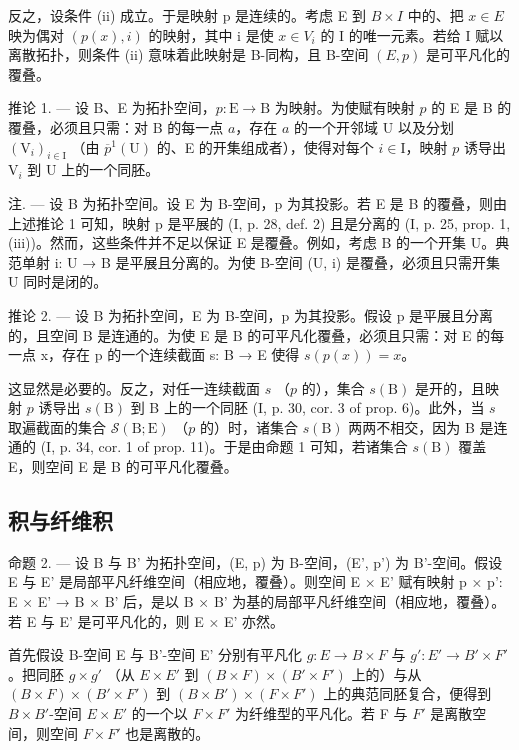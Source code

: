 反之，设条件 (ii) 成立。于是映射 p 是连续的。考虑 E 到 \(B \times I\) 中的、把 \(x \in E\) 映为偶对 \((p(x), i)\) 的映射，其中 i 是使 \(x \in V_i\) 的 I 的唯一元素。若给 I 赋以离散拓扑，则条件 (ii) 意味着此映射是 B-同构，且 B-空间 \((E, p)\) 是可平凡化的覆叠。

推论 1. --- 设 B、E 为拓扑空间，\(p\colon \mathrm{E}\to \mathrm{B}\) 为映射。为使赋有映射 \(p\) 的 E 是 B 的覆叠，必须且只需：对 B 的每一点 \(a\)，存在 \(a\) 的一个开邻域 U 以及分划 \((\mathrm{V}_i)_{i\in \mathrm{I}}\) （由 \(\overline{p}^{1}(\mathrm{U})\) 的、E 的开集组成者），使得对每个 \(i\in \mathrm{I}\)，映射 \(p\) 诱导出 \(\mathrm{V}_i\) 到 U 上的一个同胚。

注. --- 设 B 为拓扑空间。设 E 为 B-空间，p 为其投影。若 E 是 B 的覆叠，则由上述推论 1 可知，映射 p 是平展的 (I, p. 28, def. 2) 且是分离的 (I, p. 25, prop. 1, (iii))。然而，这些条件并不足以保证 E 是覆叠。例如，考虑 B 的一个开集 U。典范单射 i: U → B 是平展且分离的。为使 B-空间 (U, i) 是覆叠，必须且只需开集 U 同时是闭的。

推论 2. --- 设 B 为拓扑空间，E 为 B-空间，p 为其投影。假设 p 是平展且分离的，且空间 B 是连通的。为使 E 是 B 的可平凡化覆叠，必须且只需：对 E 的每一点 x，存在 p 的一个连续截面 s: B → E 使得 \(s(p(x)) = x\)。

这显然是必要的。反之，对任一连续截面 \(s\) （\(p\) 的），集合 \(s(\mathrm{B})\) 是开的，且映射 \(p\) 诱导出 \(s(\mathrm{B})\) 到 B 上的一个同胚 (I, p. 30, cor. 3 of prop. 6)。此外，当 \(s\) 取遍截面的集合 \(\mathcal{S}(\mathrm{B};\mathrm{E})\) （\(p\) 的）时，诸集合 \(s(\mathrm{B})\) 两两不相交，因为 B 是连通的 (I, p. 34, cor. 1 of prop. 11)。于是由命题 1 可知，若诸集合 \(s(\mathrm{B})\) 覆盖 E，则空间 E 是 B 的可平凡化覆叠。

\subsection{积与纤维积}

命题 2. --- 设 B 与 B' 为拓扑空间，(E, p) 为 B-空间，(E', p') 为 B'-空间。假设 E 与 E' 是局部平凡纤维空间（相应地，覆叠）。则空间 E × E' 赋有映射 p × p': E × E' → B × B' 后，是以 B × B' 为基的局部平凡纤维空间（相应地，覆叠）。若 E 与 E' 是可平凡化的，则 E × E' 亦然。

首先假设 B-空间 E 与 B'-空间 E' 分别有平凡化 \(g: E \to B \times F\) 与 \(g': E' \to B' \times F'\)。把同胚 \(g \times g'\) （从 \(E \times E'\) 到 \((B \times F) \times (B' \times F')\) 上的）与从 \((B \times F) \times (B' \times F')\) 到 \((B \times B') \times (F \times F')\) 上的典范同胚复合，便得到 \(B \times B'\)-空间 \(E \times E'\) 的一个以 \(F \times F'\) 为纤维型的平凡化。若 F 与 \(F'\) 是离散空间，则空间 \(F \times F'\) 也是离散的。

